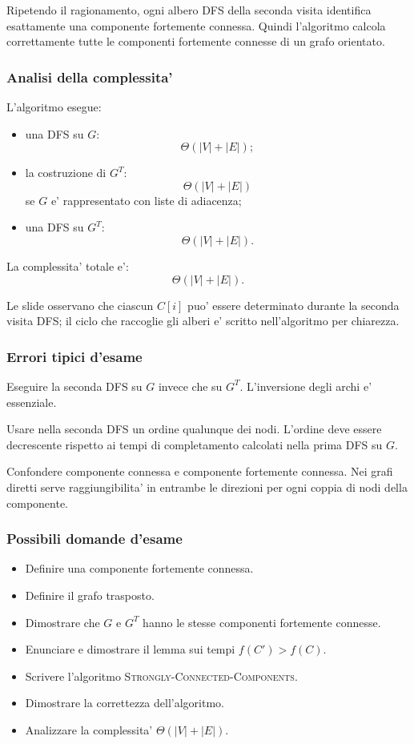 Ripetendo il ragionamento, ogni albero DFS della seconda visita identifica esattamente una componente fortemente connessa. Quindi l'algoritmo calcola correttamente tutte le componenti fortemente connesse di un grafo orientato.

\subsubsection{Analisi della complessita'}
L'algoritmo esegue:
\begin{itemize}
	\item una DFS su $G$:
	\[
	\Theta(|V|+|E|);
	\]
	\item la costruzione di $G^T$:
	\[
	\Theta(|V|+|E|)
	\]
	se $G$ e' rappresentato con liste di adiacenza;
	\item una DFS su $G^T$:
	\[
	\Theta(|V|+|E|).
	\]
\end{itemize}

La complessita' totale e':
\[
\Theta(|V|+|E|).
\]

Le slide osservano che ciascun $C[i]$ puo' essere determinato durante la seconda visita DFS; il ciclo che raccoglie gli alberi e' scritto nell'algoritmo per chiarezza.

\subsubsection{Errori tipici d'esame}
\begin{hardnote}
Eseguire la seconda DFS su $G$ invece che su $G^T$. L'inversione degli archi e' essenziale.
\end{hardnote}

\begin{hardnote}
Usare nella seconda DFS un ordine qualunque dei nodi. L'ordine deve essere decrescente rispetto ai tempi di completamento calcolati nella prima DFS su $G$.
\end{hardnote}

\begin{hardnote}
Confondere componente connessa e componente fortemente connessa. Nei grafi diretti serve raggiungibilita' in entrambe le direzioni per ogni coppia di nodi della componente.
\end{hardnote}

\subsubsection{Possibili domande d'esame}
\begin{itemize}
	\item Definire una componente fortemente connessa.
	\item Definire il grafo trasposto.
	\item Dimostrare che $G$ e $G^T$ hanno le stesse componenti fortemente connesse.
	\item Enunciare e dimostrare il lemma sui tempi $f(C')>f(C)$.
	\item Scrivere l'algoritmo \textsc{Strongly-Connected-Components}.
	\item Dimostrare la correttezza dell'algoritmo.
	\item Analizzare la complessita' $\Theta(|V|+|E|)$.
\end{itemize}

